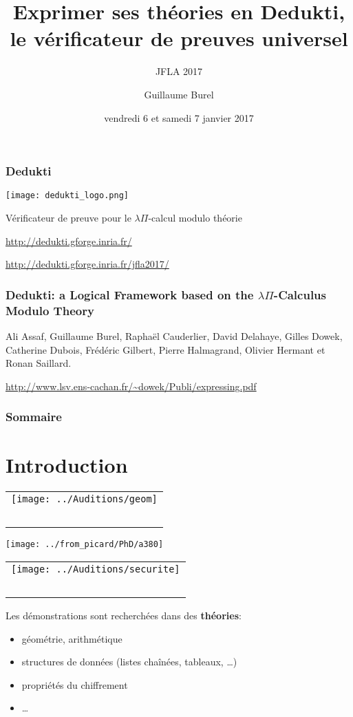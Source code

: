 \documentclass[12pt,aspectratio=169]{beamer}
\title{Exprimer ses théories en Dedukti,\\ le vérificateur de preuves universel}
\subtitle{JFLA 2017}
\author[Guillaume Burel]{Guillaume Burel}
\date[2017-01-06/07]{vendredi 6 et samedi 7 janvier 2017}
\institute{ENSIIE/Samovar}
\begin{document}
\begin{frame}
  \titlepage
\end{frame}

\begin{frame}
  \frametitle{Dedukti}
  \begin{center}
    \colorbox{mygray}{\texttt{[image: dedukti\_logo.png]}}
  \end{center}
  Vérificateur de preuve pour le $\lambda\Pi$-calcul modulo théorie
  \bigskip
  
  \url{http://dedukti.gforge.inria.fr/}
  \bigskip
  
  \url{http://dedukti.gforge.inria.fr/jfla2017/}

  
\end{frame}

\begin{frame}
  \frametitle{Dedukti: a Logical Framework based on the $\lambda\Pi$-Calculus Modulo Theory}


 Ali Assaf, Guillaume Burel,
Rapha\"el Cauderlier, David Delahaye, Gilles Dowek, Catherine Dubois,
Fr\'ed\'eric Gilbert, Pierre Halmagrand, Olivier Hermant et Ronan
Saillard.
\medskip

\url{http://www.lsv.ens-cachan.fr/~dowek/Publi/expressing.pdf}
\end{frame}

\begin{frame}
  \frametitle{Sommaire}
\tableofcontents   
\end{frame}

\section{Introduction}

\begin{frame}
    \begin{tabular}[b]{@{}c@{}}
\texttt{[image: ../Auditions/geom]}\\[1em]~
\end{tabular}\hfill
\texttt{[image: ../from\_picard/PhD/a380]}  
\hfill  \begin{tabular}[b]{@{}c@{}}
\texttt{[image: ../Auditions/securite]}\\[1.5em]~
\end{tabular}  \bigskip

Les démonstrations sont recherchées dans des \textbf{théories}:
\begin{itemize}
\item géométrie, arithmétique
\item structures de données (listes chaînées, tableaux, \dots)
\item propriétés du chiffrement
\item \dots
\end{itemize}
\end{frame}
\end{document}
